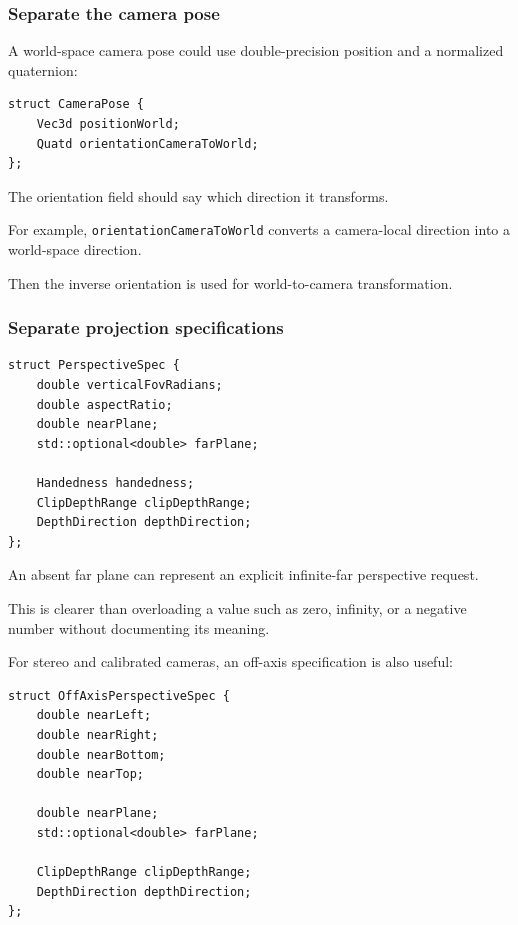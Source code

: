 \subsubsection{Separate the camera pose}\label{separate-the-camera-pose}

A world-space camera pose could use double-precision position and a normalized quaternion:

\begin{verbatim}
struct CameraPose {
    Vec3d positionWorld;
    Quatd orientationCameraToWorld;
};
\end{verbatim}

The orientation field should say which direction it transforms.

For example, \texttt{orientationCameraToWorld} converts a camera-local direction into a world-space direction.

Then the inverse orientation is used for world-to-camera transformation.

\subsubsection{Separate projection specifications}\label{separate-projection-specifications}

\begin{verbatim}
struct PerspectiveSpec {
    double verticalFovRadians;
    double aspectRatio;
    double nearPlane;
    std::optional<double> farPlane;

    Handedness handedness;
    ClipDepthRange clipDepthRange;
    DepthDirection depthDirection;
};
\end{verbatim}

An absent far plane can represent an explicit infinite-far perspective request.

This is clearer than overloading a value such as zero, infinity, or a negative number without documenting its meaning.

For stereo and calibrated cameras, an off-axis specification is also useful:

\begin{verbatim}
struct OffAxisPerspectiveSpec {
    double nearLeft;
    double nearRight;
    double nearBottom;
    double nearTop;

    double nearPlane;
    std::optional<double> farPlane;

    ClipDepthRange clipDepthRange;
    DepthDirection depthDirection;
};
\end{verbatim}

